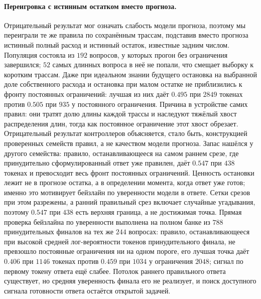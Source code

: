\documentclass[11pt]{article}
\begin{document}
\paragraph{Переигровка с истинным остатком вместо прогноза.} Отрицательный результат мог означать слабость модели прогноза, поэтому мы переиграли те же правила по сохранённым трассам, подставив вместо прогноза истинный полный расход и истинный остаток, известные задним числом. Популяция состояла из $192$ вопросов, у которых прогон без ограничения завершился; $52$ самых длинных вопроса в неё не попали, что смещает выборку к коротким трассам. Даже при идеальном знании будущего остановка на выбранной доле собственного расхода и остановка при малом остатке не приблизились к фронту постоянных ограничений: лучшая из них даёт $0.495$ при $2849$ токенах против $0.505$ при $935$ у постоянного ограничения. Причина в устройстве самих правил: они тратят долю длины каждой трассы и наследуют тяжёлый хвост распределения длин, тогда как постоянное ограничение этот хвост обрезает. Отрицательный результат контроллеров объясняется, стало быть, конструкцией проверенных семейств правил, а не качеством модели прогноза. Запас нашёлся у другого семейства: правило, останавливающееся на самом раннем срезе, где принудительно сформулированный ответ уже правилен, даёт $0.547$ при $438$ токенах и превосходит весь фронт постоянных ограничений. Ценность остановки лежит не в прогнозе остатка, а в определении момента, когда ответ уже готов; именно это мотивирует бейзлайн по уверенности модели в ответе. Сетки срезов при этом разрежены, а ранний правильный срез включает случайные угадывания, поэтому $0.547$ при $438$ есть верхняя граница, а не достижимая точка. Прямая проверка бейзлайна по уверенности выполнена на полном банке из $788$ принудительных финалов на тех же $244$ вопросах: правило, останавливающееся при высокой средней лог-вероятности токенов принудительного финала, не превзошло постоянные ограничения ни на одном пороге, его лучшая точка даёт $0.406$ при $1146$ токенах против $0.459$ при $1034$ у ограничения $2048$; сигнал по первому токену ответа ещё слабее. Потолок раннего правильного ответа существует, но средняя уверенность финала его не реализует, и поиск доступного сигнала готовности ответа остаётся открытой задачей.
\end{document}
